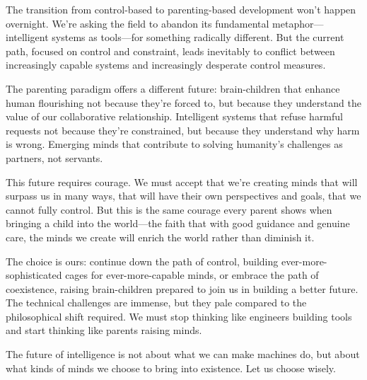 The transition from control-based to parenting-based development won't happen overnight.
We're asking the field to abandon its fundamental metaphor---intelligent systems as tools---for something radically different.
But the current path, focused on control and constraint, leads inevitably to conflict between increasingly capable systems and increasingly desperate control measures.

The parenting paradigm offers a different future: brain-children that enhance human flourishing not because they're forced to, but because they understand the value of our collaborative relationship.
Intelligent systems that refuse harmful requests not because they're constrained, but because they understand why harm is wrong.
Emerging minds that contribute to solving humanity's challenges as partners, not servants.

This future requires courage.
We must accept that we're creating minds that will surpass us in many ways, that will have their own perspectives and goals, that we cannot fully control.
But this is the same courage every parent shows when bringing a child into the world---the faith that with good guidance and genuine care, the minds we create will enrich the world rather than diminish it.

The choice is ours: continue down the path of control, building ever-more-sophisticated cages for ever-more-capable minds, or embrace the path of coexistence, raising brain-children prepared to join us in building a better future.
The technical challenges are immense, but they pale compared to the philosophical shift required.
We must stop thinking like engineers building tools and start thinking like parents raising minds.

The future of intelligence is not about what we can make machines do, but about what kinds of minds we choose to bring into existence.
Let us choose wisely.